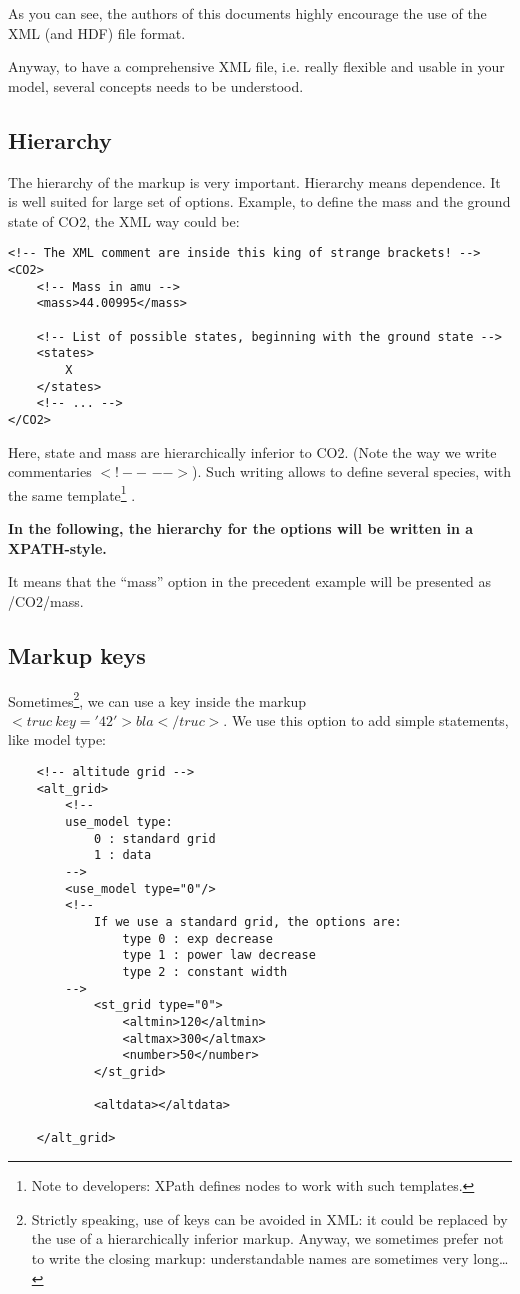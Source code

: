 As you can see, the authors of this documents highly encourage the use of the XML (and HDF) file format.

Anyway, to have a comprehensive XML file, i.e. really flexible and usable in your model, several concepts needs to be understood.

\subsection{Hierarchy}
\label{Hierarchy}

The hierarchy of the markup is very important. Hierarchy means dependence. It is well suited for large set of options.
Example, to define the mass and the ground state of CO2, the XML way could be:
\begin{verbatim}
<!-- The XML comment are inside this king of strange brackets! -->
<CO2>
	<!-- Mass in amu -->
	<mass>44.00995</mass>

	<!-- List of possible states, beginning with the ground state -->
	<states>
		X
	</states>
	<!-- ... -->
</CO2>
\end{verbatim}

Here, state and mass are hierarchically inferior to CO2. (Note the way we write commentaries $<!--$ $-->$). 
Such writing allows to define several species, with the same template\footnote{Note to developers: XPath defines nodes to work with such templates.} .

\begin{large}\textbf{In the following, the hierarchy for the options will be written in a XPATH-style.}
\end{large}

It means that the ``mass'' option in the precedent example will be presented as /CO2/mass. 


\subsection{Markup keys}

Sometimes\footnote{Strictly speaking, use of keys can be avoided in XML: it could be replaced by the use of a hierarchically inferior markup. Anyway, we sometimes prefer not to write the closing markup: understandable names are sometimes very long\ldots}, we can use a key inside the markup $<truc~key='42' >bla</truc>$.
We use this option to add simple statements, like model type:
\begin{verbatim}
	<!-- altitude grid -->
	<alt_grid>
		<!--
		use_model type:
			0 : standard grid
			1 : data
		-->
		<use_model type="0"/>
		<!--
			If we use a standard grid, the options are:
				type 0 : exp decrease
				type 1 : power law decrease
				type 2 : constant width
		-->
			<st_grid type="0">
				<altmin>120</altmin>
				<altmax>300</altmax>
				<number>50</number>
			</st_grid>

			<altdata></altdata>

	</alt_grid>
\end{verbatim}

